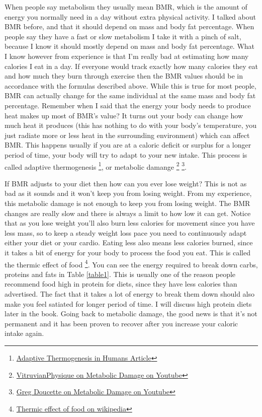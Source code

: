 \documentclass[openany, 12pt]{book}
\begin{document}
	When people say metabolism they usually mean BMR, which is the amount of energy you normally need in a day without extra physical activity. I talked about BMR before, and 
	that it should depend on mass and body fat percentage. When people say they have a fast or slow metabolism I take it with a pinch of salt, because I know it should mostly depend
        on mass and body fat percentage. What I know however from experience is that I'm really bad at estimating how many calories I eat in a day. If everyone would track exactly how
        many calories they eat and how much they burn through exercise then the BMR values should be in accordance with the formulas described above. While this is true for most people,
        BMR can actually change for the same individual at the same mass and body fat percentage. Remember when I said that the energy your body needs to produce heat makes up most of
        BMR's value? It turns out your body can change how much heat it produces (this has nothing to do with your body's temperature, you just radiate more or less heat in the surrounding
        environment) which can affect BMR. This happens usually if you are at a caloric deficit or surplus for a longer period of time, your body will try to adapt to your new intake. This
        process is called adaptive thermogenesis
        \footnote{\href{https://www.ncbi.nlm.nih.gov/pmc/articles/PMC3673773/}{Adaptive Thermogenesis in Humans Article}}, or metabolic damange
        \footnote{\href{https://www.youtube.com/watch?v=bLboowVr2DM}{VitruvianPhysique on Metabolic Damage on Youtube}}
        \footnote{\href{https://www.youtube.com/watch?v=VVF64oQ3yZk}{Greg Doucette on Metabolic Damage on Youtube}}.

        If BMR adjusts to your diet then how can you ever lose weight? This is not as bad as it sounds and it won't keep you from losing weight. From my experience, this metabolic damage is
        not enough to keep you from losing weight. The BMR changes are really slow and there is always a limit to how low it can get. Notice that as you lose weight you'll also burn less
        calories for movement since you have less mass, so to keep a steady weight loss pace you need to continuously adapt either your diet or your cardio. Eating less also means less
        calories burned, since it takes a bit of energy for your body to process the food you eat. This is called the thermic effect of food
        \footnote{\href{https://en.wikipedia.org/wiki/Specific\_dynamic\_action}{Thermic effect of food on wikipedia}}. You can see the energy required to break down carbs, proteins and
        fats in Table \ref{table1}. This is usually one of the reason people recommend food high in protein for diets, since they have less calories than advertised. The fact that it takes a lot of
        energy to break them down should also make you feel satiated for longer period of time. I will discuss high protein diets later in the book. 
        Going back to metabolic damage, the good news is that it's not permanent
        and it has been proven to recover after you increase your caloric intake again.
\end{document}
